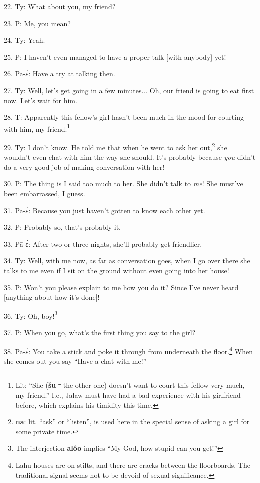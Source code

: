 22. Ty: What about you, my friend?

23. P: Me, you mean?

24. Ty: Yeah.

25. P: I haven't even managed to have a proper talk [with anybody] yet!

26. Pā-ɛ́: Have a try at talking then.

27. Ty: Well, let's get going in a few minutes... Oh, our friend is going
to eat first now. Let's wait for him.

28. T:  Apparently this fellow's girl hasn't
been much in the mood for courting with him, my friend.\footnote{Lit: ``She (\textbf{šu} ꞊ the other one) doesn't want to court this fellow very much, my friend.'' I.e., Jalaw must have had a bad experience with his girlfriend before, which explains his timidity this time.}

29. Ty: I don't know. He told me that when he went to ask her out,\footnote{\textbf{na}: lit. ``ask'' or ``listen'', is used here in the special sense of asking a girl for some private time.} she
wouldn't even chat with him the way she should. 
It's probably because \textit{you} didn't do a very good job of making conversation
with her!

30. P: The thing is I said too much to her. She didn't talk to\textit{ me}!
She must've been embarrassed, I guess.

31. Pā-ɛ́: Because you just haven't gotten to know each other yet.

32. P: Probably so, that's probably it.

33. Pā-ɛ́: After two or three nights, she'll probably get friendlier.

34. Ty: Well, with me now, as far as conversation goes, when I go over there
she talks to me even if I sit on the ground without even going into her house!

35. P: Won't you please explain to me how you do it? Since I've never heard
[anything about how it's done]!

36. Ty: Oh, boy!\footnote{The interjection \textbf{alôo} implies ``My God, how stupid can you get!''}

37. P: When you go, what's the first thing you say to the girl?

38. Pā-ɛ́: You take a stick and poke it through from underneath the floor.\footnote{Lahu houses are on stilts, and there are cracks between the floorboards. The traditional signal seems not to be devoid of sexual significance.}
When she comes out you say ``Have a chat with me!''


